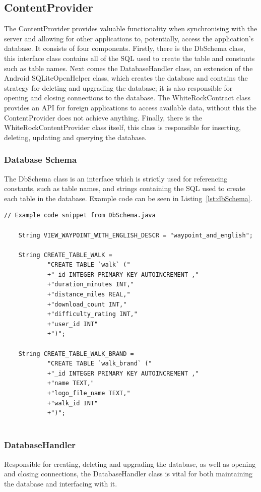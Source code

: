 \documentclass[11pt,a4paper]{article}
\begin{document}
\subsection{ContentProvider}
\label{sec:contentprovier}
The ContentProvider provides valuable functionality when synchronising with the server and allowing for other applications to, potentially, access the application's database. It consists of four components. Firstly, there is the DbSchema class, this interface class contains all of the SQL used to create the table and constants such as table names. Next comes the DatabaseHandler class, an extension of the Android SQLiteOpenHelper class, which creates the database and contains the strategy for deleting and upgrading the database; it is also responsible for opening and closing connections to the database. The WhiteRockContract class provides an API for foreign applications to access available data, without this the ContentProvider does not achieve anything. Finally, there is the WhiteRockContentProvider class itself, this class is responsible for inserting, deleting, updating and querying the database.

\subsubsection{Database Schema}
The DbSchema class is an interface which is strictly used for referencing constants, such as table names, and strings containing the SQL used to create each table in the database. Example code can be seen in Listing~\ref{lst:dbSchema}.

\begin{lstlisting}[captionpos=b, caption=DbSchema Snippet, label=lst:dbSchema, frame=single]
	// Example code snippet from DbSchema.java
	
	String VIEW_WAYPOINT_WITH_ENGLISH_DESCR = "waypoint_and_english";
	
	String CREATE_TABLE_WALK = 
			"CREATE TABLE `walk` (" 
			+"_id INTEGER PRIMARY KEY AUTOINCREMENT ,"
			+"duration_minutes INT,"
			+"distance_miles REAL,"
			+"download_count INT,"
			+"difficulty_rating INT,"
			+"user_id INT"
			+")";
	
	String CREATE_TABLE_WALK_BRAND = 
			"CREATE TABLE `walk_brand` ("
			+"_id INTEGER PRIMARY KEY AUTOINCREMENT ,"
			+"name TEXT,"
			+"logo_file_name TEXT,"
			+"walk_id INT"
			+")";
			
\end{lstlisting}

\subsubsection{DatabaseHandler}
Responsible for creating, deleting and upgrading the database, as well as opening and closing connections, the DatabaseHandler class is vital for both maintaining the database and interfacing with it.
\end{document}
